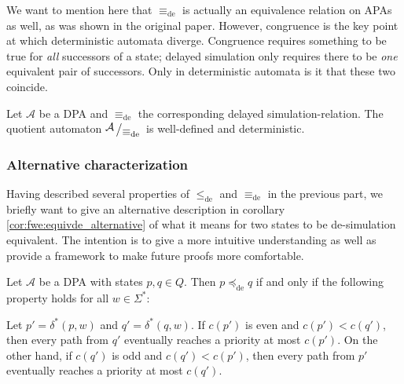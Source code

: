 We want to mention here that $\equiv_\text{de}$ is actually an equivalence relation on APAs as well, as was shown in the original paper. However, congruence is the key point at which deterministic automata diverge. Congruence requires something to be true for \emph{all} successors of a state; delayed simulation only requires there to be \emph{one} equivalent pair of successors. Only in deterministic automata is it that these two coincide.

\begin{cor}
	Let $\mathcal{A}$ be a DPA and $\equiv_\text{de}$ the corresponding delayed simulation-relation. The quotient automaton $\bigslant{\mathcal{A}}{\equiv_\text{de}}$ is well-defined and deterministic.
\end{cor}



\vspace{1cm}
\subsubsection*{Alternative characterization}
Having described several properties of $\leq_\text{de}$ and $\equiv_\text{de}$ in the previous part, we briefly want to give an alternative description in corollary \ref{cor:fwe:equivde_alternative} of what it means for two states to be de-simulation equivalent. The intention is to give a more intuitive understanding as well as provide a framework to make future proofs more comfortable.

\begin{lem}
\label{lem:fwe:preceq_alternative}
	Let $\mathcal{A}$ be a DPA with states $p, q \in Q$. Then $p \preceq_\text{de} q$ if and only if the following property holds for all $w \in \Sigma^*$: 
	
	Let $p' = \delta^*(p, w)$ and $q' = \delta^*(q, w)$. If $c(p')$ is even and $c(p') < c(q')$, then every path from $q'$ eventually reaches a priority at most $c(p')$. On the other hand, if $c(q')$ is odd and $c(q') < c(p')$, then every path from $p'$ eventually reaches a priority at most $c(q')$.
\end{lem}

